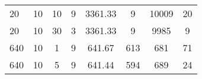 \begin{table}[H]
\begin{tabular}{l|ccccccc}
 20                                                                   & 10                                                                                                                                                             & 10                                                                                                                               & 9                                                                                                                                                              & 3361.33                                                                                                                          & 9                            & 10009                        & 20                                                                   \\
 20                                                                   & 10                                                                                                                                                             & 30                                                                                                                               & 3                                                                                                                                                              & 3361.33                                                                                                                          & 9                            & 9985                         & 9                                                                    \\
 640                                                                  & 10                                                                                                                                                             & 1                                                                                                                                & 9                                                                                                                                                              & 641.67                                                                                                                           & 613                          & 681                          & 71                                                                   \\
 640                                                                  & 10                                                                                                                                                             & 5                                                                                                                                & 9                                                                                                                                                              & 641.44                                                                                                                           & 594                          & 689                          & 24                                                                   \\

\end{tabular}
\end{table}
